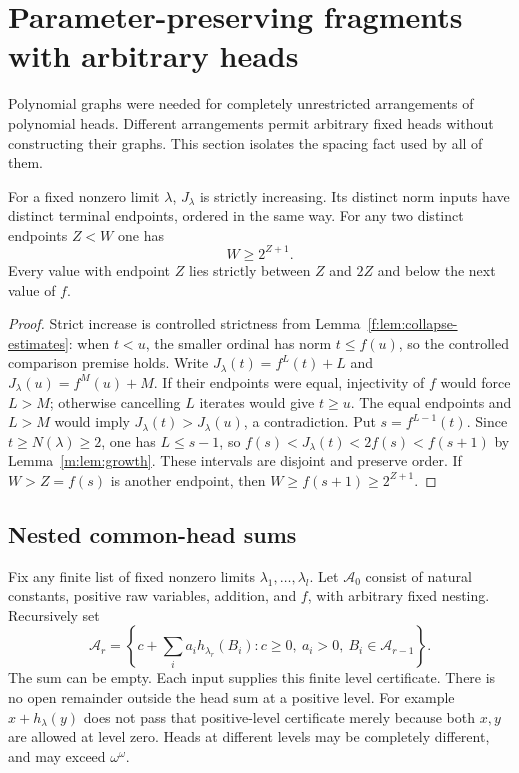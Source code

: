 \section{Parameter-preserving fragments with arbitrary heads}
\label{m:sec:certificates}
Polynomial graphs were needed for completely unrestricted arrangements of
polynomial heads. Different arrangements permit arbitrary fixed heads
without constructing their graphs. This section isolates the spacing fact
used by all of them.

\begin{lemma}\label{m:lem:endpoints}
For a fixed nonzero limit $\lambda$, $J_\lambda$ is strictly increasing.
Its distinct norm inputs have distinct terminal endpoints, ordered in the
same way. For any two distinct endpoints $Z<W$ one has
\begin{equation}\label{m:eq:sparse}
 W\ge2^{Z+1}.
\end{equation}
Every value with endpoint $Z$ lies strictly between $Z$ and $2Z$ and below
the next value of $f$.
\end{lemma}
\begin{proof}
Strict increase is controlled strictness from Lemma~\ref{f:lem:collapse-estimates}: when $t<u$, the smaller ordinal has norm
$t\le f(u)$, so the controlled comparison premise holds. Write
$J_\lambda(t)=f^L(t)+L$ and $J_\lambda(u)=f^M(u)+M$.
If their endpoints were equal, injectivity of $f$ would force $L>M$;
otherwise cancelling $L$ iterates would give $t\ge u$. The equal endpoints
and $L>M$ would imply $J_\lambda(t)>J_\lambda(u)$, a contradiction.
Put $s=f^{L-1}(t)$. Since $t\ge N(\lambda)\ge2$, one has $L\le s-1$,
so $f(s)<J_\lambda(t)<2f(s)<f(s+1)$ by Lemma~\ref{m:lem:growth}.
These intervals are disjoint and preserve order. If $W>Z=f(s)$ is another
endpoint, then $W\ge f(s+1)\ge2^{Z+1}$.
\end{proof}

\subsection{Nested common-head sums}
Fix any finite list of fixed nonzero limits $\lambda_1,\ldots,\lambda_l$.
Let $\mathcal A_0$ consist of natural constants, positive raw variables,
addition, and $f$, with arbitrary fixed nesting. Recursively set
\begin{equation}\label{m:eq:common-class}
 \mathcal A_r=\left\{c+\sum_i a_i h_{\lambda_r}(B_i):
 c\ge0,\ a_i>0,\ B_i\in\mathcal A_{r-1}\right\}.
\end{equation}
The sum can be empty. Each input supplies this finite level certificate.
There is no open remainder outside the head sum at a positive level.
For example $x+h_\lambda(y)$ does not pass that positive-level certificate
merely because both $x,y$ are allowed at level zero. Heads at different
levels may be completely different, and may exceed $\omega^\omega$.

